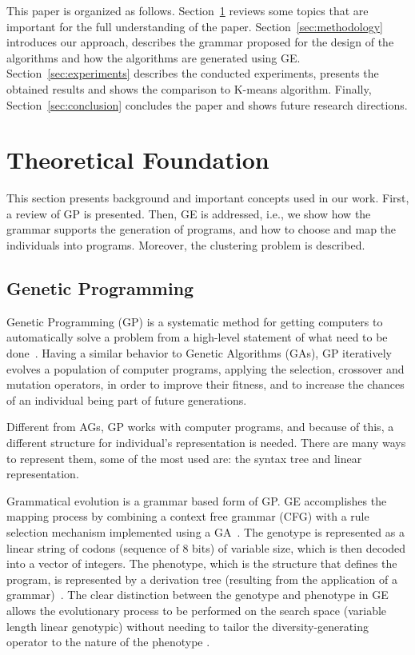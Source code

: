 \documentclass[conference]{IEEEtran}
\begin{document}
	This paper is organized as follows. Section~\ref{sec:theoretical_foudation} reviews some topics that are important for the full understanding of the paper. Section~\ref{sec:methodology} introduces our approach,  describes the grammar proposed for the design of the algorithms and how the algorithms are generated using GE. Section~\ref{sec:experiments} describes the conducted experiments,  presents the obtained results and shows the comparison to K-means algorithm. Finally, Section~\ref{sec:conclusion} concludes the paper and shows future research directions.
	
	
	\section{Theoretical Foundation} \label{sec:theoretical_foudation}
	
	
	This section presents background and important concepts used in our work. First, a review of GP is presented. Then, GE is addressed, i.e., we show how the grammar supports the generation of programs, and how to choose and map the individuals into programs. Moreover, the clustering problem is described.
	
	
	\subsection{Genetic Programming}
	
	
	Genetic Programming (GP) is a systematic method for getting computers to automatically solve a problem from a high-level statement of what need to be done~\cite{koza2005genetic}. Having a similar behavior to Genetic Algorithms (GAs), GP iteratively evolves a population of computer programs, applying the selection, crossover and mutation operators, in order to improve their fitness, and to increase the chances of an individual being part of future generations.
	
	
	Different from AGs, GP works with computer programs, and because of this, a different structure for individual's representation is needed. There are many ways to represent them, some of the most used are: the syntax tree and linear representation.
	
	
	
	Grammatical evolution is a grammar based form of GP. GE accomplishes the mapping process by combining a context free grammar (CFG) with a rule selection mechanism implemented using a GA~\cite{ryan1998grammatical}. The genotype is represented as a linear string of codons (sequence of 8 bits) of variable size, which is then decoded into a vector of integers. The phenotype, which is the structure that defines the program, is represented by a derivation tree (resulting from the application of a grammar)~\cite{cerri2013grammatical}. The clear distinction between the genotype and phenotype in GE allows the evolutionary process to be performed on the search space (variable length linear genotypic) without needing to tailor the diversity-generating operator to the nature of the phenotype \cite{sabar2013grammatical}.
	
\end{document}
